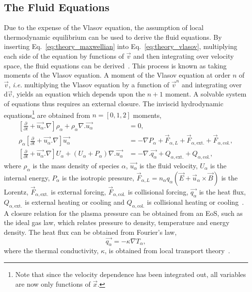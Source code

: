 \subsection{The Fluid Equations}%
\label{sec:theory_fluid}

Due to the expense of the Vlasov equation, the assumption of local thermodynamic equilibrium can be used to derive the fluid equations.
By inserting Eq.~\ref{eq:theory_maxwellian} into Eq.~\ref{eq:theory_vlasov}, multiplying each side of the equation by functions of $\vec{v}$ and then integrating over velocity space, the fluid equations can be derived~\cite{chen_introduction_2018}.
This process is known as taking moments of the Vlasov equation.
A moment of the Vlasov equation at order $n$ of $\vec{v}$, \textit{i.e.} multiplying the Vlasov equation by a function of $\vec{v}^n$ and integrating over $\text{d}\vec{v}$, yields an equation which depends upon the $n+1$ moment.
A solvable system of equations thus requires an external closure.
The inviscid hydrodynamic equations\footnote{Note that since the velocity dependence has been integrated out, all variables are now only functions of $\vec{x}$.} are obtained from $n=[0,1,2]$ moments,
\begin{align}
    \label{eq:theory_fluid_eqs_1}
    \left [ \frac{\partial}{\partial t} + \vec{u_\alpha}.\nabla \right ] \rho_\alpha + \rho_\alpha\nabla . \vec{u_\alpha} &= 0,\\
    \label{eq:theory_fluid_eqs_2}
    \rho_\alpha \left [ \frac{\partial}{\partial t} + \vec{u_\alpha}.\nabla \right ] \vec{u_\alpha} &= -\nabla P_\alpha + \vec{F}_{\alpha,L} + \vec{F}_{\alpha,\text{ext.}} + \vec{F}_{\alpha,\text{col.}},\\
    \label{eq:theory_fluid_eqs_3}
    \left [ \frac{\partial}{\partial t} + \vec{u_\alpha}.\nabla \right ] U_\alpha + (U_\alpha + P_\alpha)\nabla.\vec{u_\alpha} &= -\nabla . \vec{q_\alpha} + Q_{\alpha,\text{ext.}} + Q_{\alpha,\text{col.}},
\end{align}
where $\rho_\alpha$ is the mass density of species $\alpha$, $\vec{u_\alpha}$ is the fluid velocity, $U_\alpha$ is the internal energy, $P_\alpha$ is the isotropic pressure, $\vec{F}_{\alpha,L} = n_\alpha q_\alpha (\vec{E} + \vec{u}_\alpha \times \vec{B})$ is the Lorentz, $\vec{F}_{\alpha,\text{ext.}}$ is external forcing, $\vec{F}_{\alpha,\text{col.}}$ is collisional forcing, $\vec{q_\alpha}$ is the heat flux, $Q_{\alpha,\text{ext.}}$ is external heating or cooling and $Q_{\alpha,\text{col.}}$ is collisional heating or cooling~\cite{castor_radiation_2004}.
A closure relation for the plasma pressure can be obtained from an \ac{EoS}, such as the ideal gas law, which relates pressure to density, temperature and energy density.
The heat flux can be obtained from Fourier's law,
\begin{equation}
    \label{eq:theory_fourier_heat}
    \vec{q_\alpha} = -\kappa \nabla T_\alpha,
\end{equation}
where the thermal conductivity, $\kappa$, is obtained from local transport theory~\cite{braginskii_transport_1965,epperlein_plasma_1986}.

